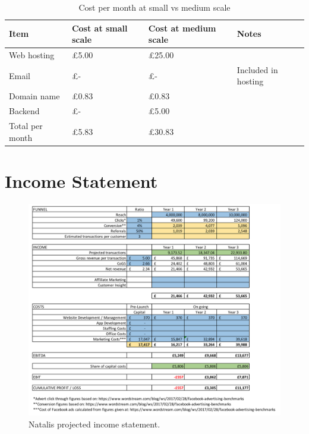\documentclass[10pt,a4paper]{article}
\begin{document}
\begin{appendices}
\begin{table}[]
	\centering
	\caption{Cost per month at small vs medium scale}
	\label{table:costpermonth}
	\begin{tabular}{llll}
		Item            & Cost at small scale & Cost at medium scale & Notes               \\ \hline
		Web hosting     & £5.00               & £25.00               &                     \\
		Email           & £-                  & £-                   & Included in hosting \\
		Domain name     & £0.83               & £0.83                &                     \\
		Backend         & £-                  & £5.00                &                     \\ \hline
		Total per month & £5.83               & £30.83               &
	\end{tabular}
\end{table}


\section{Income Statement}
\label{app:income_statement}
  \begin{figure}[!htb]
\includegraphics[width=1.0\linewidth]{income_statement.png}
    \caption{Natalis projected income statement.}
  \end{figure}


\clearpage


\end{appendices}
\end{document}
